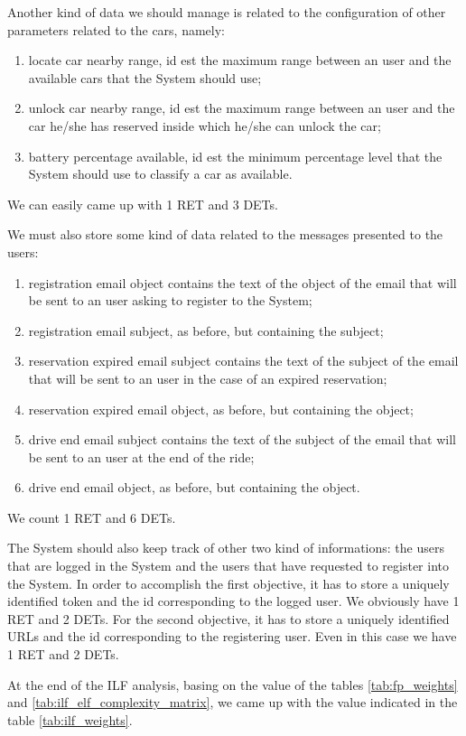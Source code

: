 Another kind of data we should manage is related to the configuration of other parameters related to the cars, namely:
\begin{enumerate}
	\item locate car nearby range, id est the maximum range between an user and the available cars that the System should use;
	\item unlock car nearby range, id est the maximum range between an user and the car he/she has reserved inside which he/she can unlock the car;
	\item battery percentage available, id est the minimum percentage level that the System should use to classify a car as available.
\end{enumerate}
We can easily came up with 1 RET and 3 DETs.
\smallskip

We must also store some kind of data related to the messages presented to the users:
\begin{enumerate}
	\item registration email object contains the text of the object of the email that will be sent to an user asking to register to the System;
	\item registration email subject, as before, but containing the subject;
	\item reservation expired email subject contains the text of the subject of the email that will be sent to an user in the case of an expired reservation;
	\item reservation expired email object, as before, but containing the object;
	\item drive end email subject contains the text of the subject of the email that will be sent to an user at the end of the ride;
	\item drive end email object, as before, but containing the object.
\end{enumerate}
We count 1 RET and 6 DETs.
\smallskip

The System should also keep track of other two kind of informations: the users that are logged in the System and the users that have requested to register into the System. 
In order to accomplish the first objective, it has to store a uniquely identified token and the id corresponding to the logged user. We obviously have 1 RET and 2 DETs.
For the second objective, it has to store a uniquely identified URLs and the id corresponding to the registering user. Even in this case we have 1 RET and 2 DETs.
\bigskip

At the end of the ILF analysis, basing on the value of the tables \ref{tab:fp_weights} and \ref{tab:ilf_elf_complexity_matrix}, we came up with the value indicated in the table \ref{tab:ilf_weights}.

